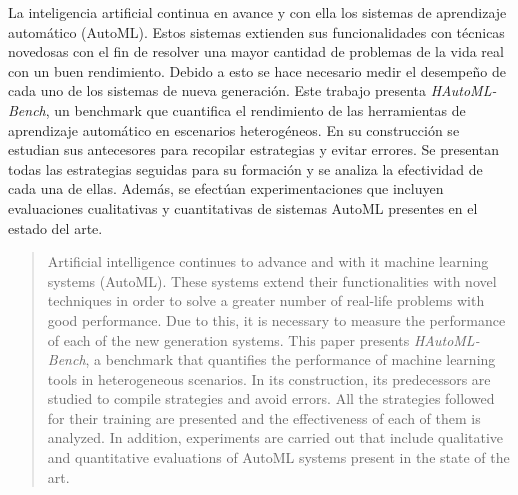 \begin{resumen}
La inteligencia artificial continua en avance y con ella los sistemas de aprendizaje automático (AutoML). Estos sistemas extienden sus 
funcionalidades con técnicas novedosas con el fin de resolver una mayor cantidad de problemas de la vida real con un buen rendimiento.
Debido a esto se hace necesario medir el desempeño de cada uno de los sistemas de nueva generación. Este trabajo presenta \textit{HAutoML-Bench}, un
benchmark que cuantifica el rendimiento de las herramientas de aprendizaje automático en escenarios heterogéneos. En su construcción se estudian sus antecesores
para recopilar estrategias y evitar errores. Se presentan todas las estrategias seguidas para su formación y se analiza la efectividad de cada una de ellas. 
Además, se efectúan experimentaciones que incluyen evaluaciones cualitativas y cuantitativas de sistemas AutoML presentes en el estado del arte.

\end{resumen}

\begin{abstract}
Artificial intelligence continues to advance and with it machine learning systems (AutoML). These systems extend their
functionalities with novel techniques in order to solve a greater number of real-life problems with good performance.
Due to this, it is necessary to measure the performance of each of the new generation systems. This paper presents \textit{HAutoML-Bench}, a benchmark that quantifies 
the performance of machine learning tools in heterogeneous scenarios. In its construction, its predecessors are studied to compile strategies and avoid errors. All the 
strategies followed for their training are presented and the effectiveness of each of them is analyzed.
In addition, experiments are carried out that include qualitative and quantitative evaluations of AutoML systems present in the state of the art.
\end{abstract}